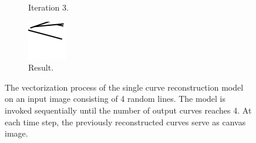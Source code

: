 \begin{figure}
\begin{subfigure}{.15\textwidth}
        \caption{Iteration 3.}
    \end{subfigure}
    \begin{subfigure}{.15\textwidth}
        \includegraphics[width=\textwidth]{graphics/work-artifacts/iterative/full/2/process/test-3.png}
        \caption{Result.}
    \end{subfigure}
    \caption{The vectorization process of the single curve reconstruction model on an input image consisting of 4 random lines. The model is invoked sequentially until the number of output curves reaches 4. At each time step, the previously reconstructed curves serve as canvas image.}
    \label{fig:iterative.2.process}
\end{figure}

